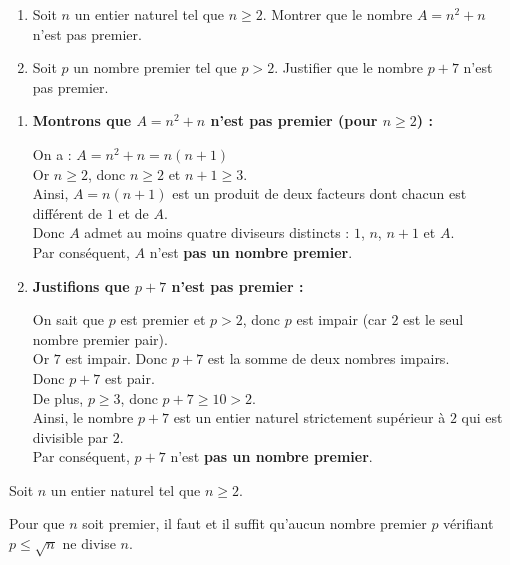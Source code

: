 \documentclass[10pt, a4paper]{article}
\begin{document}
\begin{Application}[][15 min]
\begin{enumerate}[leftmargin=*,itemsep=0.5pt]
    \item Soit $n$ un entier naturel tel que $n \ge 2$.
          Montrer que le nombre $A = n^2 + n$ n'est pas premier.
    
    \item Soit $p$ un nombre premier tel que $p > 2$. Justifier que le nombre $p + 7$ n'est pas premier.
\end{enumerate}
\end{Application}

\begin{Solution}[APPLICATION][7]
\begin{enumerate}[leftmargin=*,itemsep=0.5pt]
    \item \textbf{Montrons que $A = n^2 + n$ n'est pas premier (pour $n \geq 2$) :}

    On a : $A = n^2 + n = n(n + 1)$ \\
    Or $n \geq 2$, donc $n \geq 2$ et $n + 1 \geq 3$. \\
    Ainsi, $A = n(n+1)$ est un produit de deux facteurs dont chacun est différent de $1$ et de $A$. \\
    Donc $A$ admet au moins quatre diviseurs distincts : $1$, $n$, $n+1$ et $A$. \\
    Par conséquent, $A$ n'est \textbf{pas un nombre premier}.

    \item \textbf{Justifions que $p + 7$ n'est pas premier :}

    On sait que $p$ est premier et $p > 2$, donc $p$ est impair (car $2$ est le seul nombre premier pair). \\
    Or $7$ est impair. Donc $p + 7$ est la somme de deux nombres impairs. \\
    Donc $p + 7$ est pair. \\
    De plus, $p \geq 3$, donc $p + 7 \geq 10 > 2$. \\
    Ainsi, le nombre $p + 7$ est un entier naturel strictement supérieur à $2$ qui est divisible par $2$. \\
    Par conséquent, $p + 7$ n'est \textbf{pas un nombre premier}.
\end{enumerate}
\end{Solution}


\begin{Theoreme} Soit $n$ un entier naturel tel que $n \geq 2$.

Pour que $n$ soit premier, il faut et il suffit qu'aucun nombre premier $p$ vérifiant $p \leq \sqrt{n}$ ne divise $n$.
\end{Theoreme}
\end{document}

